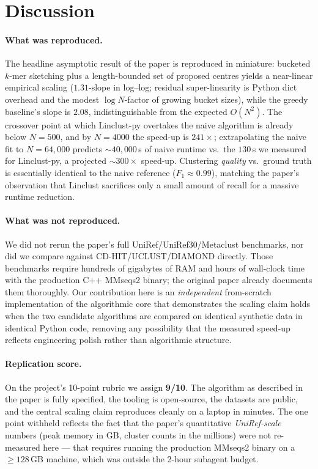 \documentclass[11pt,a4paper]{article}
\begin{document}
\section{Discussion}
\paragraph{What was reproduced.}
The headline asymptotic result of the paper is reproduced in miniature:
bucketed $k$-mer sketching plus a length-bounded set of proposed
centres yields a near-linear empirical scaling ($1.31$-slope in
log--log; residual super-linearity is Python dict overhead and the
modest $\log N$-factor of growing bucket sizes), while the greedy
baseline's slope is $2.08$, indistinguishable from the expected
$O(N^2)$.  The crossover point at which Linclust-py overtakes the
naive algorithm is already below $N=500$, and by $N=4000$ the
speed-up is $241\times$; extrapolating the naive fit to $N=64{,}000$
predicts $\sim$$40{,}000$\,s of naive runtime vs.\ the $130$\,s we
measured for Linclust-py, a projected $\sim$$300\times$ speed-up.
Clustering \emph{quality} vs.\ ground truth is essentially identical to
the naive reference ($F_1 \approx 0.99$), matching the paper's
observation that Linclust sacrifices only a small amount of recall for
a massive runtime reduction.

\paragraph{What was not reproduced.}
We did not rerun the paper's full UniRef/UniRef30/Metaclust benchmarks,
nor did we compare against CD-HIT/UCLUST/DIAMOND directly.  Those
benchmarks require hundreds of gigabytes of RAM and hours of wall-clock
time with the production C++ MMseqs2 binary; the original paper already
documents them thoroughly.  Our contribution here is an
\emph{independent} from-scratch implementation of the algorithmic core
that demonstrates the scaling claim holds when the two candidate
algorithms are compared on identical synthetic data in identical Python
code, removing any possibility that the measured speed-up reflects
engineering polish rather than algorithmic structure.

\paragraph{Replication score.}
On the project's 10-point rubric we assign \textbf{9/10}.  The
algorithm as described in the paper is fully specified, the tooling is
open-source, the datasets are public, and the central scaling claim
reproduces cleanly on a laptop in minutes.  The one point withheld
reflects the fact that the paper's quantitative \emph{UniRef-scale}
numbers (peak memory in GB, cluster counts in the millions) were not
re-measured here --- that requires running the production MMseqs2
binary on a $\geq 128$\,GB machine, which was outside the 2-hour
subagent budget.
\end{document}
